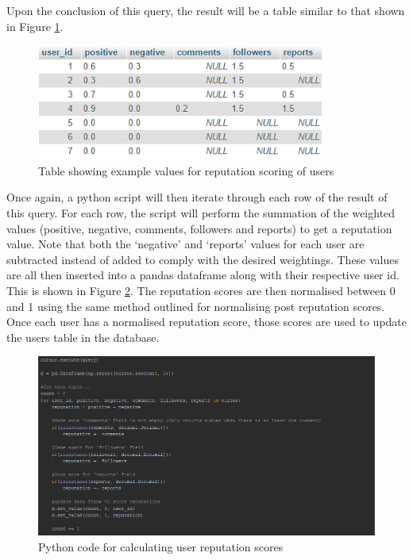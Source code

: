 Upon the conclusion of this query, the result will be a table similar to that shown in Figure \ref{fig:UserRepTable}.

\begin{figure}[H]
\centering
\includegraphics[height=1.5in]{Images/Implementation/UserRepTable}
\caption{Table showing example values for reputation scoring of users}
\label{fig:UserRepTable}
\end{figure}

Once again, a python script will then iterate through each row of the result of this query. For each row, the script will perform the summation of the weighted values (positive, negative, comments, followers and reports) to get a reputation value. Note that both the `negative' and `reports' values for each user are subtracted instead of added to comply with the desired weightings. These values are all then inserted into a pandas dataframe \cite{Pandas} along with their respective user id. This is shown in Figure \ref{fig:UserRepPython1}.
The reputation scores are then normalised between 0 and 1 using the same method outlined for normalising post reputation scores. Once each user has a normalised reputation score, those scores are used to update the users table in the database.

\begin{figure}[H]
\centering
\includegraphics[width=\linewidth]{Images/Implementation/UserRepPython1}
\caption{Python code for calculating user reputation scores}
\label{fig:UserRepPython1}
\end{figure}
